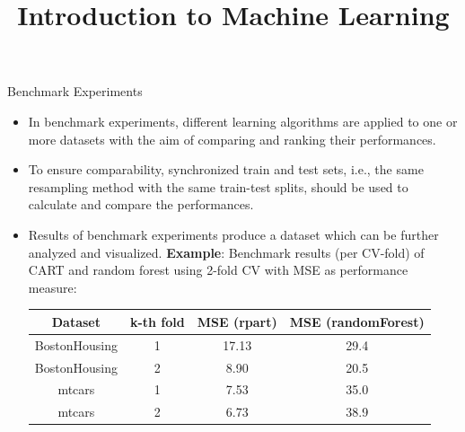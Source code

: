 



\newcommand{\titlefigure}{figure_man/mcnemar_1.png}
\newcommand{\learninggoals}{
  \item \textcolor{blue}{XXX}
  \item \textcolor{blue}{XXX}
}

\title{Introduction to Machine Learning}
\date{}




\begin{vbframe}{Benchmark Experiments}

\begin{itemize}
\item In benchmark experiments, different learning algorithms are applied to one or more datasets with the aim of comparing and ranking their performances.
\item To ensure comparability, synchronized train and test sets, i.e., the same resampling method with the same train-test splits, should be used to calculate and compare the performances.
\item Results of benchmark experiments produce a dataset which can be further analyzed and visualized. 
\newline
\textbf{Example}: Benchmark results (per CV-fold) of CART and random forest using 2-fold CV with MSE as performance measure:

\vspace{0.2cm}
\footnotesize

\begin{center}
\begin{tabular}{c|c|c|c}
\hline
Dataset & k-th fold & MSE (rpart) & MSE (randomForest)\\
\hline
BostonHousing & 1 & 17.13 & 29.4\\
\hline
BostonHousing & 2 & 8.90 & 20.5\\
\hline
mtcars & 1 & 7.53 & 35.0\\
\hline
mtcars & 2 & 6.73 & 38.9
\end{tabular}
\end{center}
\end{itemize}
\framebreak

\end{vbframe}

\normalsize

